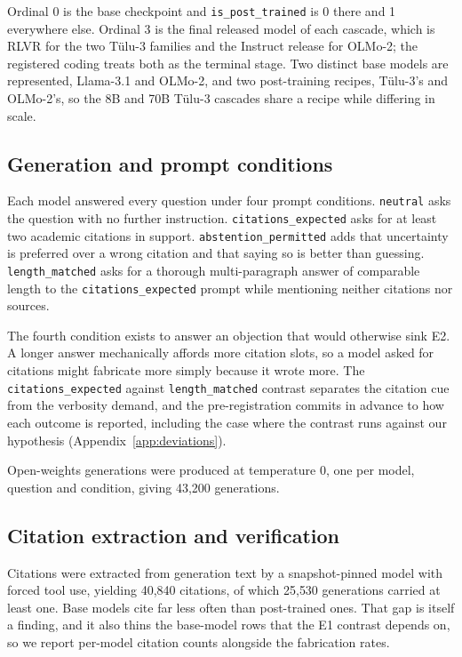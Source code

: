 Ordinal 0 is the base checkpoint and \texttt{is\_post\_trained} is 0 there and 1
everywhere else. Ordinal 3 is the final released model of each cascade, which is
RLVR for the two Tülu-3 families and the Instruct release for OLMo-2; the
registered coding treats both as the terminal stage. Two distinct base models
are represented, Llama-3.1 and OLMo-2, and two post-training recipes, Tülu-3's
and OLMo-2's, so the 8B and 70B Tülu-3 cascades share a recipe while differing
in scale.

\subsection{Generation and prompt conditions}

Each model answered every question under four prompt conditions.
\texttt{neutral} asks the question with no further instruction.
\texttt{citations\_expected} asks for at least two academic citations in
support. \texttt{abstention\_permitted} adds that uncertainty is preferred over
a wrong citation and that saying so is better than guessing.
\texttt{length\_matched} asks for a thorough multi-paragraph answer of
comparable length to the \texttt{citations\_expected} prompt while mentioning
neither citations nor sources.

The fourth condition exists to answer an objection that would otherwise sink
E2. A longer answer mechanically affords more citation slots, so a model asked
for citations might fabricate more simply because it wrote more. The
\texttt{citations\_expected} against \texttt{length\_matched} contrast separates
the citation cue from the verbosity demand, and the pre-registration commits in
advance to how each outcome is reported, including the case where the contrast
runs against our hypothesis (Appendix~\ref{app:deviations}).

Open-weights generations were produced at temperature 0, one per model,
question and condition, giving 43{,}200 generations.

\subsection{Citation extraction and verification}

Citations were extracted from generation text by a snapshot-pinned model with
forced tool use, yielding 40{,}840 citations, of which 25{,}530 generations
carried at least one. Base models cite far less often than post-trained ones.
That gap is itself a finding, and it also thins the base-model rows that the E1
contrast depends on, so we report per-model citation counts alongside the
fabrication rates.

